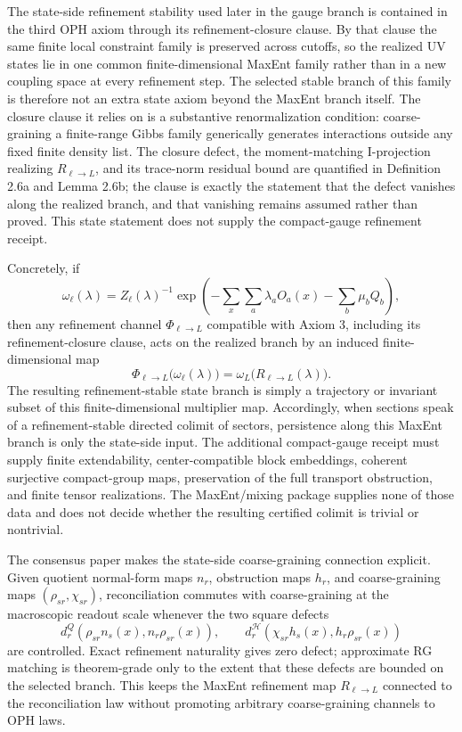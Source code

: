 The state-side refinement stability used later in the gauge branch is contained in the third OPH axiom through its refinement-closure clause. By that clause the same finite local constraint family is preserved across cutoffs, so the realized UV states lie in one common finite-dimensional MaxEnt family rather than in a new coupling space at every refinement step. The selected stable branch of this family is therefore not an extra state axiom beyond the MaxEnt branch itself. The closure clause it relies on is a substantive renormalization condition: coarse-graining a finite-range Gibbs family generically generates interactions outside any fixed finite density list. The closure defect, the moment-matching I-projection realizing \(R_{\ell\to L}\), and its trace-norm residual bound are quantified in Definition 2.6a and Lemma 2.6b; the clause is exactly the statement that the defect vanishes along the realized branch, and that vanishing remains assumed rather than proved. This state statement does not supply the compact-gauge refinement receipt.

Concretely, if
\[
\omega_\ell(\lambda)
=
Z_\ell(\lambda)^{-1}
\exp\!\left(
-\sum_x \sum_a \lambda_a O_a(x)-\sum_b \mu_b Q_b
\right),
\]
then any refinement channel \(\Phi_{\ell\to L}\) compatible with Axiom 3, including its refinement-closure clause, acts on the realized branch by an induced finite-dimensional map
\[
\Phi_{\ell\to L}\bigl(\omega_\ell(\lambda)\bigr)
=
\omega_L\!\bigl(R_{\ell\to L}(\lambda)\bigr).
\]
The resulting refinement-stable state branch is simply a trajectory or invariant subset of this finite-dimensional multiplier map. Accordingly, when sections speak of a refinement-stable directed colimit of sectors, persistence along this MaxEnt branch is only the state-side input. The additional compact-gauge receipt must supply finite extendability, center-compatible block embeddings, coherent surjective compact-group maps, preservation of the full transport obstruction, and finite tensor realizations. The MaxEnt/mixing package supplies none of those data and does not decide whether the resulting certified colimit is trivial or nontrivial.

The consensus paper makes the state-side coarse-graining connection explicit. Given quotient
normal-form maps \(n_r\), obstruction maps \(h_r\), and coarse-graining maps
\((\rho_{sr},\chi_{sr})\), reconciliation commutes with coarse-graining at the macroscopic readout
scale whenever the two square defects
\[
d^Q_r(\rho_{sr}n_s(x),n_r\rho_{sr}(x)),
\qquad
d^{\mathcal H}_r(\chi_{sr}h_s(x),h_r\rho_{sr}(x))
\]
are controlled. Exact refinement naturality gives zero defect; approximate RG matching is
theorem-grade only to the extent that these defects are bounded on the selected branch. This keeps
the MaxEnt refinement map \(R_{\ell\to L}\) connected to the reconciliation law without promoting
arbitrary coarse-graining channels to OPH laws.

